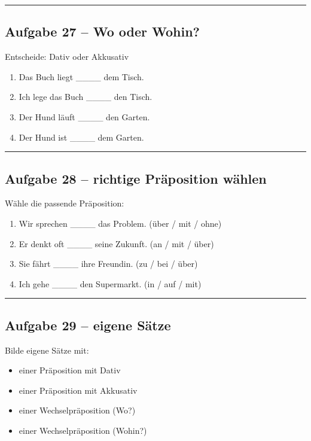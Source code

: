 \documentclass[a4paper,12pt]{article}
\newcommand{\linie}{\vspace{4pt}\hrule\vspace{10pt}}
\begin{document}
\linie

\subsection*{Aufgabe 27 – Wo oder Wohin?}

Entscheide: Dativ oder Akkusativ

\begin{enumerate}
\item Das Buch liegt \_\_\_\_ dem Tisch.
\item Ich lege das Buch \_\_\_\_ den Tisch.
\item Der Hund läuft \_\_\_\_ den Garten.
\item Der Hund ist \_\_\_\_ dem Garten.
\end{enumerate}

\linie

\subsection*{Aufgabe 28 – richtige Präposition wählen}

Wähle die passende Präposition:

\begin{enumerate}
\item Wir sprechen \_\_\_\_ das Problem. (über / mit / ohne)
\item Er denkt oft \_\_\_\_ seine Zukunft. (an / mit / über)
\item Sie fährt \_\_\_\_ ihre Freundin. (zu / bei / über)
\item Ich gehe \_\_\_\_ den Supermarkt. (in / auf / mit)
\end{enumerate}

\linie

\subsection*{Aufgabe 29 – eigene Sätze}

Bilde eigene Sätze mit:

\begin{itemize}
\item einer Präposition mit Dativ
\item einer Präposition mit Akkusativ
\item einer Wechselpräposition (Wo?)
\item einer Wechselpräposition (Wohin?)
\end{itemize}
\end{document}
